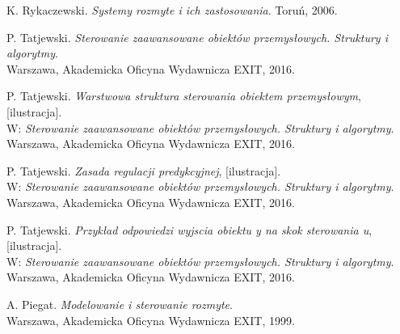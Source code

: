 \begin{thebibliography}{99}
 K. Rykaczewski. \textit{Systemy rozmyte i ich zastosowania}. Toruń, 2006.

 P. Tatjewski. \textit{Sterowanie zaawansowane obiektów przemysłowych. Struktury i algorytmy}.\\ Warszawa, Akademicka Oficyna Wydawnicza EXIT, 2016.

 P. Tatjewski. \textit{Warstwowa struktura sterowania obiektem przemysłowym}, [ilustracja].\\ W: \textit{Sterowanie zaawansowane obiektów przemysłowych. Struktury i algorytmy}.\\ Warszawa, Akademicka Oficyna Wydawnicza EXIT, 2016.

 P. Tatjewski. \textit{Zasada regulacji predykcyjnej}, [ilustracja].\\ W: \textit{Sterowanie zaawansowane obiektów przemysłowych. Struktury i algorytmy}.\\ Warszawa, Akademicka Oficyna Wydawnicza EXIT, 2016.

\newpage

 P. Tatjewski. \textit{Przykład odpowiedzi wyjscia obiektu y na skok sterowania u}, [ilustracja].\\ W: \textit{Sterowanie zaawansowane obiektów przemysłowych. Struktury i algorytmy}.\\ Warszawa, Akademicka Oficyna Wydawnicza EXIT, 2016.

 A. Piegat. \textit{Modelowanie i sterowanie rozmyte}.\\ Warszawa, Akademicka Oficyna Wydawnicza EXIT, 1999.

\end{thebibliography}